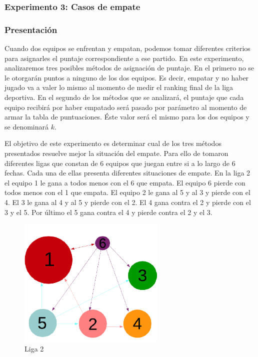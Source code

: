         \subsubsection{Experimento 3: Casos de empate}

            \subsubsection*{Presentación}
            Cuando dos equipos se enfrentan y empatan, podemos tomar diferentes criterios para asignarles el puntaje correspondiente a ese partido. En este experimento, analizaremos tres posibles métodos de asignación de puntaje. En el primero no se le otorgarán puntos a ninguno de los dos equipos. Es decir, empatar y no haber jugado va a valer lo mismo al momento de medir el ranking final de la liga deportiva. En el segundo de los métodos que se analizará, el puntaje que cada equipo recibirá por haber empatado será pasado por parámetro al momento de armar la tabla de puntuaciones. Éste valor será el mismo para los dos equipos y se denominará $k$.

            El objetivo de este experimento es determinar cual de los tres métodos presentados resuelve mejor la situación del empate. Para ello de tomaron diferentes ligas que constan de 6 equipos que juegan entre si a lo largo de 6 fechas. Cada una de ellas presenta diferentes situaciones de empate.
            En la liga 2 el equipo 1 le gana a todos menos con el 6 que empata. El equipo 6 pierde con todos menos con el 1 que empata. El equipo 2 le gana al 5 y al 3 y pierde con el 4. El 3 le gana al 4 y al 5 y pierde con el 2. El 4 gana contra el 2 y pierde con el 3 y el 5. Por último el 5 gana contra el 4 y pierde contra el 2 y el 3.
                \begin{figure}[h]
                    \begin{center}
                      \includegraphics[width=7cm]{imagenes/liga2.png} \\
                      {\small Liga 2}
                    \end{center}
                \end{figure}


